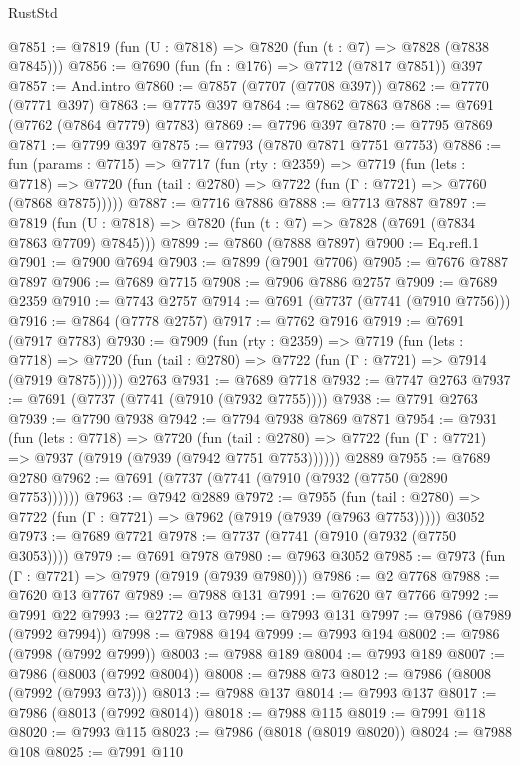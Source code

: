 \begin{lexlean}{RustStd}
\begin{coremodule}
@7851 := @7819 (fun (U : @7818) => @7820 (fun (t : @7) => @7828 (@7838 @7845)))
@7856 := @7690 (fun (fn : @176) => @7712 (@7817 @7851)) @397
@7857 := And.intro
@7860 := @7857 (@7707 (@7708 @397))
@7862 := @7770 (@7771 @397)
@7863 := @7775 @397
@7864 := @7862 @7863
@7868 := @7691 (@7762 (@7864 @7779) @7783)
@7869 := @7796 @397
@7870 := @7795 @7869
@7871 := @7799 @397
@7875 := @7793 (@7870 @7871 @7751 @7753)
@7886 := fun (params : @7715) =>
  @7717
    (fun (rty : @2359) =>
    @7719
      (fun (lets : @7718) =>
      @7720 (fun (tail : @2780) => @7722 (fun (Γ : @7721) => @7760 (@7868 @7875)))))
@7887 := @7716 @7886
@7888 := @7713 @7887
@7897 := @7819 (fun (U : @7818) => @7820 (fun (t : @7) => @7828 (@7691 (@7834 @7863 @7709) @7845)))
@7899 := @7860 (@7888 @7897)
@7900 := Eq.refl.{1}
@7901 := @7900 @7694
@7903 := @7899 (@7901 @7706)
@7905 := @7676 @7887 @7897
@7906 := @7689 @7715
@7908 := @7906 @7886 @2757
@7909 := @7689 @2359
@7910 := @7743 @2757
@7914 := @7691 (@7737 (@7741 (@7910 @7756)))
@7916 := @7864 (@7778 @2757)
@7917 := @7762 @7916
@7919 := @7691 (@7917 @7783)
@7930 := @7909
    (fun (rty : @2359) =>
    @7719
      (fun (lets : @7718) =>
      @7720 (fun (tail : @2780) => @7722 (fun (Γ : @7721) => @7914 (@7919 @7875)))))
    @2763
@7931 := @7689 @7718
@7932 := @7747 @2763
@7937 := @7691 (@7737 (@7741 (@7910 (@7932 @7755))))
@7938 := @7791 @2763
@7939 := @7790 @7938
@7942 := @7794 @7938 @7869 @7871
@7954 := @7931
    (fun (lets : @7718) =>
    @7720
      (fun (tail : @2780) => @7722 (fun (Γ : @7721) => @7937 (@7919 (@7939 (@7942 @7751 @7753))))))
    @2889
@7955 := @7689 @2780
@7962 := @7691 (@7737 (@7741 (@7910 (@7932 (@7750 (@2890 @7753))))))
@7963 := @7942 @2889
@7972 := @7955
    (fun (tail : @2780) => @7722 (fun (Γ : @7721) => @7962 (@7919 (@7939 (@7963 @7753)))))
    @3052
@7973 := @7689 @7721
@7978 := @7737 (@7741 (@7910 (@7932 (@7750 @3053))))
@7979 := @7691 @7978
@7980 := @7963 @3052
@7985 := @7973 (fun (Γ : @7721) => @7979 (@7919 (@7939 @7980)))
@7986 := @2 @7768
@7988 := @7620 @13 @7767
@7989 := @7988 @131
@7991 := @7620 @7 @7766
@7992 := @7991 @22
@7993 := @2772 @13
@7994 := @7993 @131
@7997 := @7986 (@7989 (@7992 @7994))
@7998 := @7988 @194
@7999 := @7993 @194
@8002 := @7986 (@7998 (@7992 @7999))
@8003 := @7988 @189
@8004 := @7993 @189
@8007 := @7986 (@8003 (@7992 @8004))
@8008 := @7988 @73
@8012 := @7986 (@8008 (@7992 (@7993 @73)))
@8013 := @7988 @137
@8014 := @7993 @137
@8017 := @7986 (@8013 (@7992 @8014))
@8018 := @7988 @115
@8019 := @7991 @118
@8020 := @7993 @115
@8023 := @7986 (@8018 (@8019 @8020))
@8024 := @7988 @108
@8025 := @7991 @110

\end{coremodule}
\end{lexlean}
